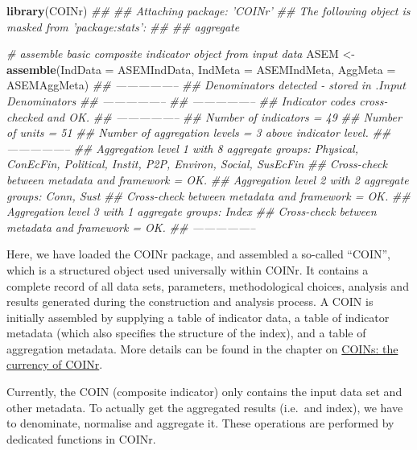 \documentclass[
]{book}
\newenvironment{Shaded}{\begin{snugshade}}{\end{snugshade}}
\newcommand{\CommentTok}[1]{\textcolor[rgb]{0.56,0.35,0.01}{\textit{#1}}}
\newcommand{\DataTypeTok}[1]{\textcolor[rgb]{0.13,0.29,0.53}{#1}}
\newcommand{\KeywordTok}[1]{\textcolor[rgb]{0.13,0.29,0.53}{\textbf{#1}}}
\newcommand{\NormalTok}[1]{#1}
\newcommand{\StringTok}[1]{\textcolor[rgb]{0.31,0.60,0.02}{#1}}
\begin{document}
\begin{Shaded}
\begin{Highlighting}[]
\KeywordTok{library}\NormalTok{(COINr)}
\CommentTok{## }
\CommentTok{## Attaching package: 'COINr'}
\CommentTok{## The following object is masked from 'package:stats':}
\CommentTok{## }
\CommentTok{##     aggregate}

\CommentTok{# assemble basic composite indicator object from input data}
\NormalTok{ASEM <-}\StringTok{ }\KeywordTok{assemble}\NormalTok{(}\DataTypeTok{IndData =}\NormalTok{ ASEMIndData,}
                 \DataTypeTok{IndMeta =}\NormalTok{ ASEMIndMeta,}
                 \DataTypeTok{AggMeta =}\NormalTok{ ASEMAggMeta)}
\CommentTok{## -----------------}
\CommentTok{## Denominators detected - stored in .$Input$Denominators}
\CommentTok{## -----------------}
\CommentTok{## -----------------}
\CommentTok{## Indicator codes cross-checked and OK.}
\CommentTok{## -----------------}
\CommentTok{## Number of indicators = 49}
\CommentTok{## Number of units = 51}
\CommentTok{## Number of aggregation levels = 3 above indicator level.}
\CommentTok{## -----------------}
\CommentTok{## Aggregation level 1 with 8 aggregate groups: Physical, ConEcFin, Political, Instit, P2P, Environ, Social, SusEcFin}
\CommentTok{## Cross-check between metadata and framework = OK.}
\CommentTok{## Aggregation level 2 with 2 aggregate groups: Conn, Sust}
\CommentTok{## Cross-check between metadata and framework = OK.}
\CommentTok{## Aggregation level 3 with 1 aggregate groups: Index}
\CommentTok{## Cross-check between metadata and framework = OK.}
\CommentTok{## -----------------}
\end{Highlighting}
\end{Shaded}

Here, we have loaded the COINr package, and assembled a so-called ``COIN'', which is a structured object used universally within COINr. It contains a complete record of all data sets, parameters, methodological choices, analysis and results generated during the construction and analysis process. A COIN is initially assembled by supplying a table of indicator data, a table of indicator metadata (which also specifies the structure of the index), and a table of aggregation metadata. More details can be found in the chapter on \protect\hyperlink{coins-the-currency-of-coinr}{COINs: the currency of COINr}.

Currently, the COIN (composite indicator) only contains the input data set and other metadata. To actually get the aggregated results (i.e.~and index), we have to denominate, normalise and aggregate it. These operations are performed by dedicated functions in COINr.
\end{document}
